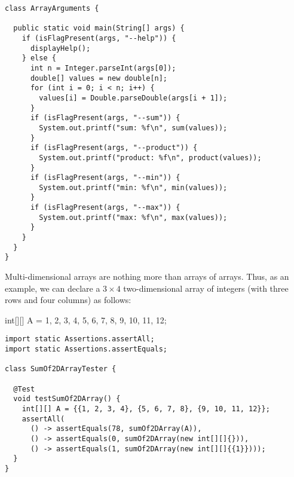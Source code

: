 \begin{lstlisting}[language=MyJava]
class ArrayArguments {

  public static void main(String[] args) {
    if (isFlagPresent(args, "--help")) {
      displayHelp();
    } else {
      int n = Integer.parseInt(args[0]);
      double[] values = new double[n];
      for (int i = 0; i < n; i++) { 
        values[i] = Double.parseDouble(args[i + 1]); 
      }
      if (isFlagPresent(args, "--sum")) { 
        System.out.printf("sum: %f\n", sum(values)); 
      }
      if (isFlagPresent(args, "--product")) { 
        System.out.printf("product: %f\n", product(values)); 
      }
      if (isFlagPresent(args, "--min")) { 
        System.out.printf("min: %f\n", min(values)); 
      }
      if (isFlagPresent(args, "--max")) { 
        System.out.printf("max: %f\n", max(values)); 
      }
    }
  }
}
\end{lstlisting}


Multi-dimensional arrays are nothing more than arrays of arrays. Thus, as an example, we can declare a $3 \times 4$ two-dimensional array of integers (with three rows and four columns) as follows:
\begin{verbnobox}[\small]
int[][] A = {{1, 2, 3, 4}, {5, 6, 7, 8}, {9, 10, 11, 12}};
\end{verbnobox}

\begin{lstlisting}[language=MyJava]
import static Assertions.assertAll;
import static Assertions.assertEquals;

class SumOf2DArrayTester {

  @Test
  void testSumOf2DArray() {
    int[][] A = {{1, 2, 3, 4}, {5, 6, 7, 8}, {9, 10, 11, 12}};
    assertAll(
      () -> assertEquals(78, sumOf2DArray(A)),
      () -> assertEquals(0, sumOf2DArray(new int[][]{})),
      () -> assertEquals(1, sumOf2DArray(new int[][]{{1}})));
  }
}
\end{lstlisting}

